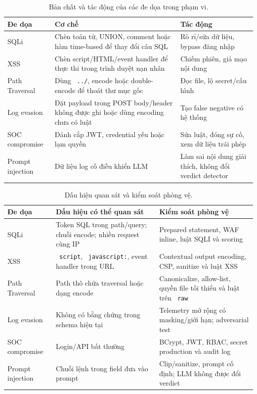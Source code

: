 \documentclass[runningheads]{report-template/llncs}
\newcommand{\code}[1]{\texttt{\small\hyphenchar\font=45 #1}}
\begin{document}
\begin{table}
\caption{Bản chất và tác động của các đe dọa trong phạm vi.}
\label{tab:threats}
\centering\small
\begin{tabularx}{\textwidth}{@{}p{22mm}p{53mm}Y@{}}
\toprule
Đe dọa & Cơ chế & Tác động\\
\midrule
SQLi & Chèn toán tử, UNION, comment hoặc hàm time-based để thay đổi câu
SQL & Rò rỉ/sửa dữ liệu, bypass đăng nhập\\
XSS & Chèn script/HTML/event handler để thực thi trong trình duyệt nạn
nhân & Chiếm phiên, giả mạo nội dung\\
Path Traversal & Dùng \code{../}, encode hoặc double-encode để thoát thư
mục gốc & Đọc file, lộ secret/cấu hình\\
Log evasion & Đặt payload trong POST body/header không được ghi hoặc dùng
encoding chưa có luật & Tạo false negative có hệ thống\\
SOC compromise & Đánh cắp JWT, credential yếu hoặc lạm quyền & Sửa luật,
đóng sự cố, xem dữ liệu trái phép\\
Prompt injection & Dữ liệu log cố điều khiển LLM & Làm sai nội dung giải
thích, không đổi verdict detector\\
\bottomrule
\end{tabularx}
\end{table}

\begin{table}
\caption{Dấu hiệu quan sát và kiểm soát phòng vệ.}
\label{tab:controls}
\centering\small
\begin{tabularx}{\textwidth}{@{}p{22mm}p{48mm}Y@{}}
\toprule
Đe dọa & Dấu hiệu có thể quan sát & Kiểm soát phòng vệ\\
\midrule
SQLi & Token SQL trong path/query; chuỗi encode; nhiều request cùng IP &
Prepared statement, WAF inline, luật SQLI và scoring\\
XSS & \code{script}, \code{javascript:}, event handler trong URL &
Contextual output encoding, CSP, sanitize và luật XSS\\
Path Traversal & Path thô chứa traversal hoặc dạng encode & Canonicalize,
allow-list, quyền file tối thiểu và luật trên \code{raw}\\
Log evasion & Không có bằng chứng trong schema hiện tại & Telemetry mở
rộng có masking/giới hạn; adversarial test\\
SOC compromise & Login/API bất thường & BCrypt, JWT, RBAC, secret
production và audit log\\
Prompt injection & Chuỗi lệnh trong field đưa vào prompt & Clip/sanitize,
prompt cố định; LLM không được đổi verdict\\
\bottomrule
\end{tabularx}
\end{table}
\end{document}
